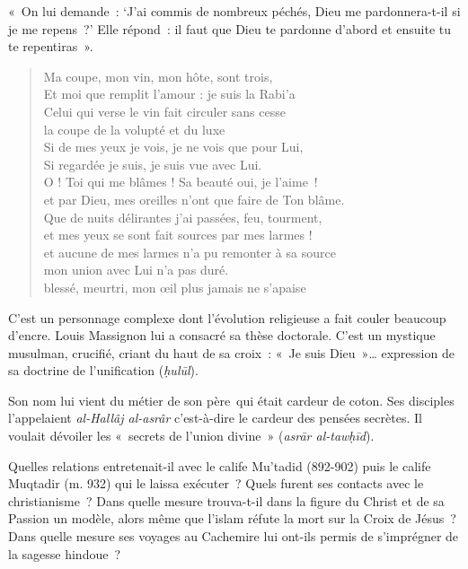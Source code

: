 «~On lui demande~: `J'ai commis de nombreux péchés, Dieu me
pardonnera-t-il si je me repens~?' Elle répond~: il faut que Dieu te
pardonne d'abord et ensuite tu te repentiras~».

\begin{quote}
Ma coupe, mon vin, mon hôte, sont trois,\\
Et moi que remplit l'amour : je suis la Rabi'a\\
Celui qui verse le vin fait circuler sans cesse\\
la coupe de la volupté et du luxe\\
Si de mes yeux je vois, je ne vois que pour Lui,\\
Si regardée je suis, je suis vue avec Lui.\\
O ! Toi qui me blâmes ! Sa beauté oui, je l'aime~!\\
et par Dieu, mes oreilles n'ont que faire de Ton blâme.\\
Que de nuits délirantes j'ai passées, feu, tourment,\\
et mes yeux se sont fait sources par mes larmes !\\
et aucune de mes larmes n'a pu remonter à sa source\\
mon union avec Lui n'a pas duré.\\
blessé, meurtri, mon œil plus jamais ne s'apaise
\end{quote}


C'est un personnage complexe dont l'évolution religieuse a fait couler
beaucoup d'encre. Louis Massignon lui a consacré sa thèse doctorale.
C'est un mystique musulman, crucifié, criant du haut de sa croix~: «~Je
suis Dieu~»\ldots{} expression de sa doctrine de l'unification
(\emph{ḥulūl}).

Son nom lui vient du métier de son père~qui était cardeur de coton. Ses
disciples l'appelaient \emph{al-Hallâj al-asrâr} c'est-à-dire le cardeur
des pensées secrètes. Il voulait dévoiler les «~secrets de l'union
divine~» (\emph{asrār al-tawḥīd}).

Quelles relations entretenait-il avec le calife Mu'tadid (892-902) puis
le calife Muqtadir (m. 932) qui le laissa exécuter~? Quels furent ses
contacts avec le christianisme~? Dans quelle mesure trouva-t-il dans la
figure du Christ et de sa Passion un modèle, alors même que l'islam
réfute la mort sur la Croix de Jésus~? Dans quelle mesure ses voyages au
Cachemire lui ont-ils permis de s'imprégner de la sagesse hindoue~?

